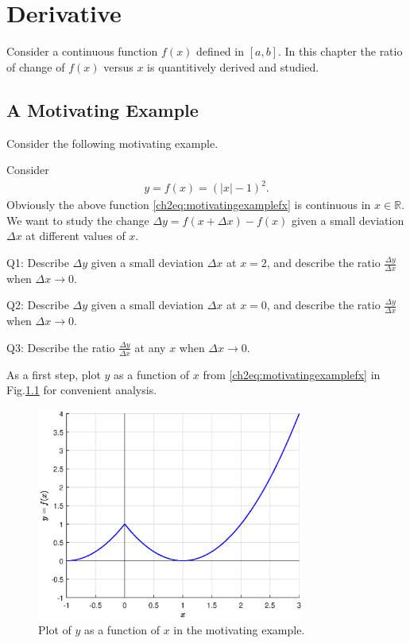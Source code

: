 \chapter{Derivative}

Consider a continuous function $f(x)$ defined in $\left[a,b\right]$. In this chapter the ratio of change of $f(x)$ versus $x$ is quantitively derived and studied.

\section{A Motivating Example}

Consider the following motivating example.

\begin{shortbox}

Consider
\begin{eqnarray}
  y = f(x) = \left(|x|-1\right)^2. \label{ch2eq:motivatingexamplefx}
\end{eqnarray}
Obviously the above function \eqref{ch2eq:motivatingexamplefx} is continuous in $x\in\mathbb{R}$. We want to study the change $\Delta y = f\left(x+\Delta x\right) - f(x)$ given a small deviation $\Delta x$ at different values of $x$.

Q1: Describe $\Delta y$ given a small deviation $\Delta x$ at $x=2$, and describe the ratio $\frac{\Delta y}{\Delta x}$ when $\Delta x \rightarrow 0$.

Q2: Describe $\Delta y$ given a small deviation $\Delta x$ at $x=0$, and describe the ratio $\frac{\Delta y}{\Delta x}$ when $\Delta x \rightarrow 0$.

Q3: Describe the ratio $\frac{\Delta y}{\Delta x}$ at any $x$ when $\Delta x \rightarrow 0$.
\end{shortbox}

As a first step, plot $y$ as a function of $x$ from \eqref{ch2eq:motivatingexamplefx} in Fig.\ref{ch2fig:fxsimpleexample} for convenient analysis.
\begin{figure}
\centering
\includegraphics[width=250pt]{chapters/chapter2/figures/fig_1.eps}
\caption{Plot of $y$ as a function of $x$ in the motivating example.} \label{ch2fig:fxsimpleexample}
\end{figure}

